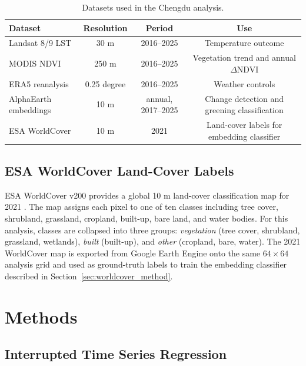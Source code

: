 \documentclass{article}
\begin{document}
\begin{table}[H]
\caption{Datasets used in the Chengdu analysis.}
\label{tab:data_summary}
\centering
\small
\begin{tabular}{lccc}
\toprule
\textbf{Dataset} & \textbf{Resolution} & \textbf{Period} & \textbf{Use} \\
\midrule
Landsat 8/9 LST & 30 m & 2016--2025 & Temperature outcome \\
MODIS NDVI & 250 m & 2016--2025 & Vegetation trend and annual $\Delta$NDVI \\
ERA5 reanalysis & 0.25 degree & 2016--2025 & Weather controls \\
AlphaEarth embeddings & 10 m & annual, 2017--2025 & Change detection and greening classification \\
ESA WorldCover & 10 m & 2021 & Land-cover labels for embedding classifier \\
\bottomrule
\end{tabular}
\end{table}

\subsection{ESA WorldCover Land-Cover Labels}

ESA WorldCover v200 provides a global 10 m land-cover classification map for
2021 \citep{Zanaga2022}. The map assigns each pixel to one of ten classes
including tree cover, shrubland, grassland, cropland, built-up, bare land, and
water bodies. For this analysis, classes are collapsed into three groups:
\textit{vegetation} (tree cover, shrubland, grassland, wetlands), \textit{built}
(built-up), and \textit{other} (cropland, bare, water). The 2021 WorldCover map
is exported from Google Earth Engine onto the same $64 \times 64$ analysis grid
and used as ground-truth labels to train the embedding classifier described in
Section~\ref{sec:worldcover_method}.

\section{Methods}
\label{sec:methods}

\subsection{Interrupted Time Series Regression}
\end{document}
